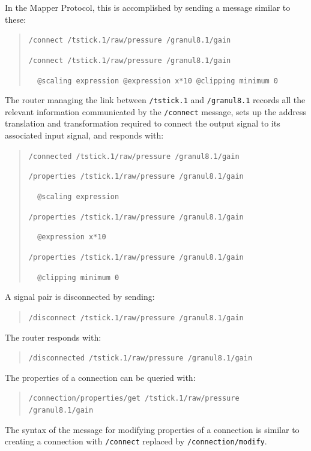 In the Mapper Protocol, this is accomplished by sending a message similar to these:

\begin{quote}
\verb#/connect /tstick.1/raw/pressure /granul8.1/gain#

\verb#/connect /tstick.1/raw/pressure /granul8.1/gain#

\verb#  @scaling expression @expression x*10 @clipping minimum 0#
\end{quote}

The router managing the link between \verb#/tstick.1# and \verb#/granul8.1# records all the relevant information communicated by the \verb#/connect# message, sets up the address translation and transformation required to connect the output signal to its associated input signal, and responds with:

\begin{quote}
\verb#/connected /tstick.1/raw/pressure /granul8.1/gain#

\verb#/properties /tstick.1/raw/pressure /granul8.1/gain#

\verb#  @scaling expression#

\verb#/properties /tstick.1/raw/pressure /granul8.1/gain#

\verb#  @expression x*10#

\verb#/properties /tstick.1/raw/pressure /granul8.1/gain#

\verb#  @clipping minimum 0#
\end{quote}

A signal pair is disconnected by sending:

\begin{quote}
\verb#/disconnect /tstick.1/raw/pressure /granul8.1/gain#
\end{quote}

The router responds with:

\begin{quote}
\verb#/disconnected /tstick.1/raw/pressure /granul8.1/gain#
\end{quote}

The properties of a connection can be queried with:

\begin{quote}
\verb#/connection/properties/get /tstick.1/raw/pressure /granul8.1/gain#
\end{quote}

The syntax of the message for modifying properties of a connection is similar to creating a connection with \verb#/connect# replaced by \verb#/connection/modify#.


